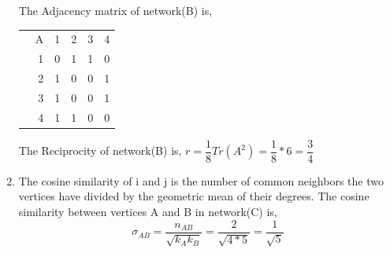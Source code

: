 \documentclass{article}
\begin{document}
\begin{enumerate}[label=(\alph*)]
The Adjacency matrix of network(B) is,
\begin{tabular}{l r|l l l l }                      
& \multicolumn{1}{r|}{A} &1   &2   &3   &4   \\ \cline{2-6}
& \multicolumn{1}{r|}{1} &0   &1   &1   &0   \\
& \multicolumn{1}{r|}{2} &1   &0   &0   &1   \\ 
& \multicolumn{1}{r|}{3} &1   &0   &0   &1   \\
& \multicolumn{1}{r|}{4} &1   &1   &0   &0   \\ 
\end{tabular}

The Reciprocity of network(B) is, $ r = \dfrac{1}{8} Tr(A^2) = \dfrac{1}{8}*6 = \dfrac{3}{4}$

\item
The cosine similarity of i and j is the number of common neighbors the two vertices have divided by the geometric mean of their degrees. The cosine similarity between vertices A and B in network(C) is,
$$\sigma_{AB} = \dfrac{n_{AB}}{\sqrt{k_A k_B}} = \dfrac{2}{\sqrt{4 * 5}} = \dfrac{1}{\sqrt{5}}$$
\end{enumerate}
\end{document}
